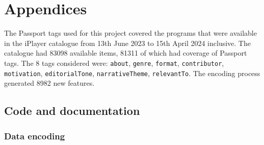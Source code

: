 \section{Appendices}

The Passport tags used for this project covered the programs that were available in the iPlayer catalogue
from 13th June 2023 to 15th April 2024 inclusive. The catalogue had 83098 available items, 81311 of which had coverage of Passport tags.
The 8 tags considered were: \verb|about|, \verb|genre|, \verb|format|, \verb|contributor|, \verb|motivation|, \verb|editorialTone|, \verb|narrativeTheme|, \verb|relevantTo|.
The encoding process generated 8982 new features.

\subsection{Code and documentation}

\subsubsection{Data encoding}


